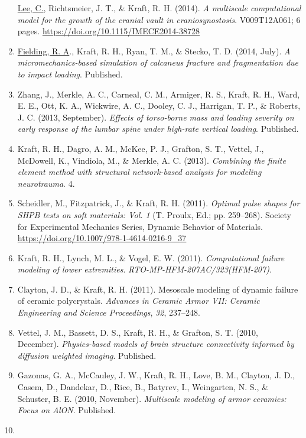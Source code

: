 \documentclass[11pt]{article}
\begin{document}
\begin{enumerate}
  \underline{Lee, C.}, Richtsmeier, J. 
T., \& Kraft, R. 
H. 
(2014). 
\emph{A
  multiscale computational model for the growth of the cranial vault in
  craniosynostosis}. 
V009T12A061; 6 pages.
  \url{https://doi.org/10.1115/IMECE2014-38728}
\item
  \underline{Fielding, R. 
A}., Kraft, R. 
H., Ryan, T. 
M., \& Stecko, T. 
D. 
(2014,
  July). 
\emph{A micromechanics-based simulation of calcaneus fracture
  and fragmentation due to impact loading}. 
Published.
\item
  Zhang, J., Merkle, A. 
C., Carneal, C. 
M., Armiger, R. 
S., Kraft, R.
  H., Ward, E. 
E., Ott, K. 
A., Wickwire, A. 
C., Dooley, C. 
J., Harrigan,
  T. 
P., \& Roberts, J. 
C. 
(2013, September). 
\emph{Effects of
  torso-borne mass and loading severity on early response of the lumbar
  spine under high-rate vertical loading}. 
Published.
\item
  Kraft, R. 
H., Dagro, A. 
M., McKee, P. 
J., Grafton, S. 
T., Vettel, J.,
  McDowell, K., Vindiola, M., \& Merkle, A. 
C. 
(2013). 
\emph{Combining
  the finite element method with structural network-based analysis for
  modeling neurotrauma}. 
4.
\item
  Scheidler, M., Fitzpatrick, J., \& Kraft, R. 
H. 
(2011). 
\emph{Optimal
  pulse shapes for SHPB tests on soft materials: Vol. 
1} (T. 
Proulx,
  Ed.; pp. 
259--268). 
Society for Experimental Mechanics Series, Dynamic
  Behavior of Materials.
  \url{https://doi.org/10.1007/978-1-4614-0216-9_37}
\item
  Kraft, R. 
H., Lynch, M. 
L., \& Vogel, E. 
W. 
(2011).
  \emph{Computational failure modeling of lower extremities}.
  \emph{RTO-MP-HFM-207AC/323(HFM-207)}.
\item
  Clayton, J. 
D., \& Kraft, R. 
H. 
(2011). 
Mesoscale modeling of dynamic
  failure of ceramic polycrystals. 
\emph{Advances in Ceramic Armor VII:
  Ceramic Engineering and Science Proceedings}, \emph{32}, 237--248.
\item
  Vettel, J. 
M., Bassett, D. 
S., Kraft, R. 
H., \& Grafton, S. 
T. 
(2010,
  December). 
\emph{Physics-based models of brain structure connectivity
  informed by diffusion weighted imaging}. 
Published.
\item
  Gazonas, G. 
A., McCauley, J. 
W., Kraft, R. 
H., Love, B. 
M., Clayton,
  J. 
D., Casem, D., Dandekar, D., Rice, B., Batyrev, I., Weingarten, N.
  S., \& Schuster, B. 
E. 
(2010, November). 
\emph{Multiscale modeling of
  armor ceramics: Focus on AlON}. 
Published.
\item

\end{enumerate}
\end{document}
